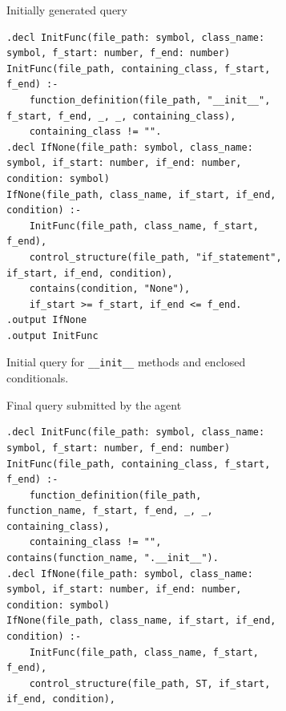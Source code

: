 \begin{landscape}
\begin{figure}[p]
\captionsetup{font=small,skip=3pt}
\centering
\begin{subfigure}[t]{\linewidth}
\vspace{0pt}
\centering
\begin{stepbox}[datalocstep]{Initially generated query}
\begin{verbatim}
.decl InitFunc(file_path: symbol, class_name: symbol, f_start: number, f_end: number)
InitFunc(file_path, containing_class, f_start, f_end) :-
    function_definition(file_path, "__init__", f_start, f_end, _, _, containing_class),
    containing_class != "".
.decl IfNone(file_path: symbol, class_name: symbol, if_start: number, if_end: number, condition: symbol)
IfNone(file_path, class_name, if_start, if_end, condition) :-
    InitFunc(file_path, class_name, f_start, f_end),
    control_structure(file_path, "if_statement", if_start, if_end, condition),
    contains(condition, "None"),
    if_start >= f_start, if_end <= f_end.
.output IfNone
.output InitFunc
\end{verbatim}
\end{stepbox}
\caption{Initial query for \texttt{\_\_init\_\_} methods and enclosed conditionals.}
\label{fig:dataloc-query-initial}
\end{subfigure}
\par
\begin{subfigure}[t]{\linewidth}
\vspace{0pt}
\centering
\begin{stepbox}[datalocstep]{Final query submitted by the agent}
\begin{verbatim}
.decl InitFunc(file_path: symbol, class_name: symbol, f_start: number, f_end: number)
InitFunc(file_path, containing_class, f_start, f_end) :-
    function_definition(file_path, function_name, f_start, f_end, _, _, containing_class),
    containing_class != "", contains(function_name, ".__init__").
.decl IfNone(file_path: symbol, class_name: symbol, if_start: number, if_end: number, condition: symbol)
IfNone(file_path, class_name, if_start, if_end, condition) :-
    InitFunc(file_path, class_name, f_start, f_end),
    control_structure(file_path, ST, if_start, if_end, condition),

\end{verbatim}
\end{stepbox}
\end{subfigure}
\end{figure}
\end{landscape}
